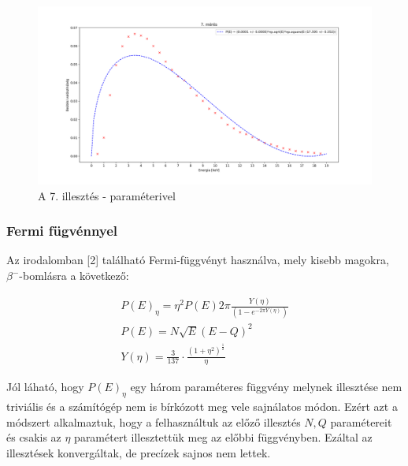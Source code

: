 \documentclass[12pt,a4paper]{article}
\theoremstyle{plain}
\begin{document}
\vspace{0.2cm}

\begin{figure}[H]
	\centering
	\includegraphics[width=0.95\linewidth ]{./atlagolt-gorbek-hibakkal6.png}
	\caption{A 7. illesztés - paraméterivel}
\end{figure}

\vspace{0.2cm}

\subsubsection{Fermi fügvénnyel}

\par Az irodalomban [2] található Fermi-függvényt használva, mely
kisebb magokra, $\beta^{-}$-bomlásra a következő:

\vspace{0.2cm}

\begin{align*}
	P(E)_{\eta} = \eta^{2}P(E)2\pi \frac{Y(\eta)}{(1-e^{-2\pi Y(\eta)})} \\
	P(E) = N\sqrt{E}(E - Q)^{2}                                          \\
	Y(\eta) =  \frac{3}{137}\cdot\frac{(1 + \eta^{2})^{\frac{1}{2}}}{\eta}
\end{align*}

\vspace{0.2cm}

\par Jól láható, hogy $P(E)_{\eta}$ egy három paraméteres függvény
melynek illesztése nem triviális és a számítógép nem is bírkózott meg vele
sajnálatos módon. Ezért azt a módszert alkalmaztuk, hogy a felhasználtuk
az előző illesztés $N, Q$  paramétereit és csakis az $\eta$
paramétert illesztettük meg az előbbi függvényben. Ezáltal az illesztések
konvergáltak, de precízek sajnos nem lettek.
\end{document}
